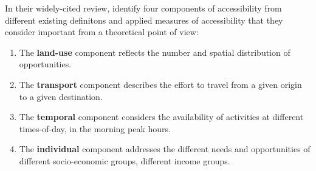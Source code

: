 In their widely-cited review, \citet{Geurs2004AccessibilityReview} identify four components of accessibility 
from different existing definitons and applied measures of accessibility that they consider important from a 
theoretical point of view:

\begin{enumerate}
	\item The \textbf{land-use} component reflects
	the number and spatial distribution of opportunities.
	
	\item The \textbf{transport} component describes the effort
	to travel from a given origin to a given destination.
	
	\item The \textbf{temporal} component considers the availability of activities at
	different times-of-day, \eg in the morning peak hours.
	
	\item The \textbf{individual} component addresses the different needs and
	opportunities of different socio-economic groups, \eg different income groups.
\end{enumerate}

